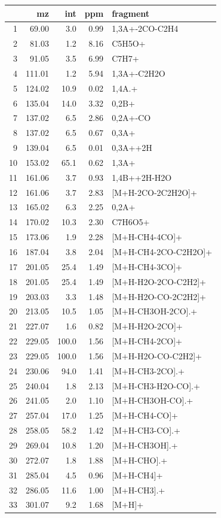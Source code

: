 \documentclass[]{article}
\begin{document}
\begin{table}[ht]
\centering
\begin{tabular}{rrrrl}
  \toprule
 & mz & int & ppm & fragment \\ 
  \midrule
1 & 69.00 & 3.0 & 0.99 & 1,3A+-2CO-C2H4 \\ 
  2 & 81.03 & 1.2 & 8.16 & C5H5O+ \\ 
  3 & 91.05 & 3.5 & 6.99 & C7H7+ \\ 
  4 & 111.01 & 1.2 & 5.94 & 1,3A+-C2H2O \\ 
  5 & 124.02 & 10.9 & 0.02 & 1,4A.+ \\ 
  6 & 135.04 & 14.0 & 3.32 & 0,2B+ \\ 
  7 & 137.02 & 6.5 & 2.86 & 0,2A+-CO \\ 
  8 & 137.02 & 6.5 & 0.67 & 0,3A+ \\ 
  9 & 139.04 & 6.5 & 0.01 & 0,3A++2H \\ 
  10 & 153.02 & 65.1 & 0.62 & 1,3A+ \\ 
  11 & 161.06 & 3.7 & 0.93 & 1,4B++2H-H2O \\ 
  12 & 161.06 & 3.7 & 2.83 & [M+H-2CO-2C2H2O]+ \\ 
  13 & 165.02 & 6.3 & 2.25 & 0,2A+ \\ 
  14 & 170.02 & 10.3 & 2.30 & C7H6O5+ \\ 
  15 & 173.06 & 1.9 & 2.28 & [M+H-CH4-4CO]+ \\ 
  16 & 187.04 & 3.8 & 2.04 & [M+H-CH4-2CO-C2H2O]+ \\ 
  17 & 201.05 & 25.4 & 1.49 & [M+H-CH4-3CO]+ \\ 
  18 & 201.05 & 25.4 & 1.49 & [M+H-H2O-2CO-C2H2]+ \\ 
  19 & 203.03 & 3.3 & 1.48 & [M+H-H2O-CO-2C2H2]+ \\ 
  20 & 213.05 & 10.5 & 1.05 & [M+H-CH3OH-2CO].+ \\ 
  21 & 227.07 & 1.6 & 0.82 & [M+H-H2O-2CO]+ \\ 
  22 & 229.05 & 100.0 & 1.56 & [M+H-CH4-2CO]+ \\ 
  23 & 229.05 & 100.0 & 1.56 & [M+H-H2O-CO-C2H2]+ \\ 
  24 & 230.06 & 94.0 & 1.41 & [M+H-CH3-2CO].+ \\ 
  25 & 240.04 & 1.8 & 2.13 & [M+H-CH3-H2O-CO].+ \\ 
  26 & 241.05 & 2.0 & 1.10 & [M+H-CH3OH-CO].+ \\ 
  27 & 257.04 & 17.0 & 1.25 & [M+H-CH4-CO]+ \\ 
  28 & 258.05 & 58.2 & 1.42 & [M+H-CH3-CO].+ \\ 
  29 & 269.04 & 10.8 & 1.20 & [M+H-CH3OH].+ \\ 
  30 & 272.07 & 1.8 & 1.88 & [M+H-CHO].+ \\ 
  31 & 285.04 & 4.5 & 0.96 & [M+H-CH4]+ \\ 
  32 & 286.05 & 11.6 & 1.00 & [M+H-CH3].+ \\ 
  33 & 301.07 & 9.2 & 1.68 & [M+H]+ \\ 
   \bottomrule
\end{tabular}
\end{table}
\end{document}
